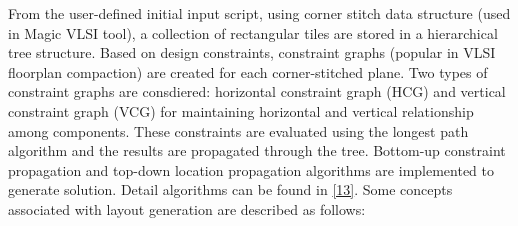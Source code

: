\documentclass[11pt]{article}
\begin{document}
From the user-defined initial input script, using corner stitch data structure (used in Magic VLSI tool), a collection of rectangular tiles are stored in a hierarchical tree structure. Based on design constraints, constraint graphs (popular in VLSI floorplan compaction) are created for each corner-stitched plane. Two types of constraint graphs are consdiered: horizontal constraint graph (HCG) and vertical constraint graph (VCG) for maintaining horizontal and vertical relationship among components. These constraints are evaluated using the longest path algorithm and the results are propagated through the tree. Bottom-up constraint propagation and top-down location propagation algorithms are implemented to generate solution. Detail algorithms can be found in \href{./Publications/I.Al.Razi-ECCE_19.pdf}{[13]}. Some concepts associated with layout generation are described as follows:
\end{document}
